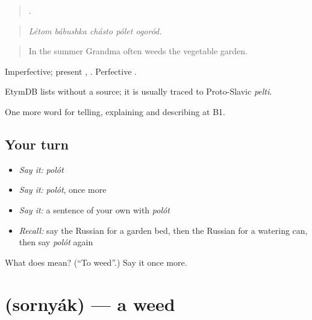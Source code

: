 \begin{quote}
    .
\end{quote}

\begin{quote}
\emph{Létom bábushka chásto pólet ogoród.}
\end{quote}

\begin{quote}
In the summer Grandma often weeds the vegetable garden.
\end{quote}

Imperfective; present , . Perfective .

\begin{cousinweb}
EtymDB lists \emph{} without a source; it is usually traced to Proto-Slavic \emph{pelti}.
\end{cousinweb}

\begin{grammarlens}[title={What you've built}]
One more word for telling, explaining and describing at B1.
\end{grammarlens}

\subsection*{Your turn}
\begin{itemize}
\raggedright
  \item \emph{Say it:} \emph{polót}
  \item \emph{Say it:} \emph{polót}, once more
  \item \emph{Say it:} a sentence of your own with \emph{polót}
  \item \emph{Recall:} say the Russian for a garden bed, then the Russian for a watering can, then say \emph{polót} again
\end{itemize}

\begin{tcolorbox}[breakable,colback=teal!4,colframe=teal!35!black,title={Before you move on}]
What does  mean? (\textquotedblleft{}To weed\textquotedblright{}.) Say it once more.
\end{tcolorbox}
\section[\texorpdfstring{\ru{сорняк} (sornyák)}{сорняк (sornyák)}]{ (sornyák) — a weed}

\label{lesson:RU-C506-sornyak}



